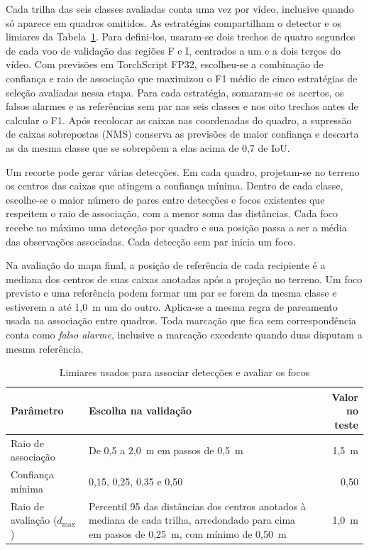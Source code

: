 Cada trilha das seis classes avaliadas conta uma vez por vídeo, inclusive quando só aparece em quadros omitidos. As estratégias compartilham o detector e os limiares da Tabela~\ref{tab_limiares_focos}. Para defini-los, usaram-se dois trechos de quatro segundos de cada voo de validação das regiões F e I, centrados a um e a dois terços do vídeo. Com previsões em TorchScript FP32, escolheu-se a combinação de confiança e raio de associação que maximizou o F1 médio de cinco estratégias de seleção avaliadas nessa etapa. Para cada estratégia, somaram-se os acertos, os falsos alarmes e as referências sem par nas seis classes e nos oito trechos antes de calcular o F1. Após recolocar as caixas nas coordenadas do quadro, a supressão de caixas sobrepostas (NMS) conserva as previsões de maior confiança e descarta as da mesma classe que se sobrepõem a elas acima de 0,7 de IoU.

Um recorte pode gerar várias detecções. Em cada quadro, projetam-se no terreno os centros das caixas que atingem a confiança mínima. Dentro de cada classe, escolhe-se o maior número de pares entre detecções e focos existentes que respeitem o raio de associação, com a menor soma das distâncias. Cada foco recebe no máximo uma detecção por quadro e sua posição passa a ser a média das observações associadas. Cada detecção sem par inicia um foco.

Na avaliação do mapa final, a posição de referência de cada recipiente é a mediana dos centros de suas caixas anotadas após a projeção no terreno. Um foco previsto e uma referência podem formar um par se forem da mesma classe e estiverem a até 1,0~m um do outro. Aplica-se a mesma regra de pareamento usada na associação entre quadros. Toda marcação que fica sem correspondência conta como \emph{falso alarme}, inclusive a marcação excedente quando duas disputam a mesma referência.

\begin{table}[!htbp]
  \centering
  \caption{Limiares usados para associar detecções e avaliar os focos}
  \label{tab_limiares_focos}
  \small
  \begin{tabular}{@{}p{}p{}r@{}}
    \hline
    Parâmetro & Escolha na validação & Valor no teste \\
    \hline
    Raio de associação & De 0,5 a 2,0~m em passos de 0,5~m & 1,5~m \\
    Confiança mínima & 0,15, 0,25, 0,35 e 0,50 & 0,50 \\
    Raio de avaliação ($d_{\max}$) & Percentil 95 das distâncias dos centros anotados à mediana de cada trilha, arredondado para cima em passos de 0,25~m, com mínimo de 0,50~m & 1,0~m \\
    \hline
  \end{tabular}
\end{table}

